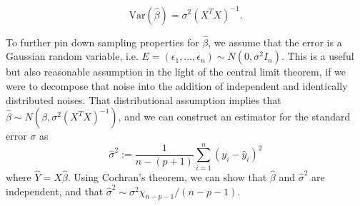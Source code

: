 \documentclass[]{article}
\begin{document}
\begin{equation}
\mathrm{Var}(\hat{\beta})=\sigma^2 (X^TX)^{-1}.
\end{equation}

\noindent To further pin down sampling properties for $\hat{\beta}$, we assume that the error is a Gaussian random variable, i.e. $E=(\epsilon_1, ..., \epsilon_n)\sim N(0,\sigma^2 I_n)$. This is a useful but also reasonable assumption in the light of the central limit theorem, if we were to decompose that noise into the addition of independent and identically distributed noises. That distributional assumption implies that $\hat{\beta}\sim N\left(\beta,\sigma^2(X^TX)^{-1}\right)$, and we can construct an estimator for the standard error $\sigma$ as
\begin{equation}
\hat{\sigma}^2:=\frac{1}{n-(p+1)}\sum_{i=1}^n (y_i-\hat{y}_i)^2
\end{equation}
where $\hat{Y}=X\hat{\beta}$. Using Cochran's theorem, we can show that $\hat{\beta}$ and $\hat{\sigma}^2$ are independent, and that $\hat{\sigma}^2 \sim \sigma^2 \chi_{n-p-1} /(n-p-1)$.  \\ 
\end{document}
